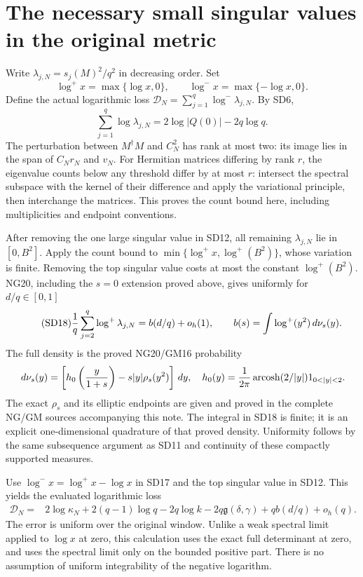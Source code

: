\section{The necessary small singular values in the original metric}
Write $\lambda_{j,N}=s_j(M)^2/q^2$ in decreasing order. Set
\[
\log^+x=\max\{\log x,0\},\qquad \log^-x=\max\{-\log x,0\}.
\]
Define the actual logarithmic loss
$\mathcal D_N=\sum_{j=1}^q\log^-\lambda_{j,N}$.
By SD6,
\begin{equation}\tag{SD17}
\sum_{j=1}^q\log\lambda_{j,N}=2\log|Q(0)|-2q\log q.
\end{equation}
The perturbation between $M^\dagger M$ and $C_N^2$ has rank at most
two: its image lies in the span of $C_Nr_N$ and $v_N$.
For Hermitian matrices differing by rank $r$, the eigenvalue counts
below any threshold differ by at most $r$: intersect the spectral
subspace with the kernel of their difference and apply the variational
principle, then interchange the matrices. This proves the count bound
here, including multiplicities and endpoint conventions.

After removing the one large singular value in SD12, all remaining
$\lambda_{j,N}$ lie in $[0,B^2]$. Apply the count bound to
$\min\{\log^+x,\log^+(B^2)\}$, whose variation is finite. Removing
the top singular value costs at most the constant $\log^+(B^2)$.
NG20, including the $s=0$
extension proved above, gives uniformly for $d/q\in[0,1]$
\begin{equation}\tag{SD18}
\frac1q\sum_{j=2}^q\log^+\lambda_{j,N}
=b(d/q)+o_h(1),\qquad
b(s)=\int\log^+(y^2)\,d\nu_s(y).
\end{equation}
The full density is the proved NG20/GM16 probability
\[
\osddd\nu_s(y)=\left[h_0\left(\frac y{1+s}\right)
-s|y|\rho_s(y^2)\right]\osddd y,\quad
h_0(y)=\frac1{2\pi}\operatorname{arcosh}(2/|y|)1_{0<|y|<2}.
\]
The exact $\rho_s$ and its elliptic endpoints are given and proved in
the complete NG/GM sources accompanying this note. The integral in
SD18 is finite; it is an explicit one-dimensional quadrature of that
proved density. Uniformity follows by the same subsequence argument
as SD11 and continuity of these compactly supported measures.

Use $\log^-x=\log^+x-\log x$ in SD17 and the top singular value in
SD12. This yields the evaluated logarithmic loss
\begin{equation}\tag{SD19}
\boxed{\begin{aligned}
\mathcal D_N={}&2\log\kappa_N+2(q-1)\log q-2q\log k
-2q\mathfrak g(\delta,\gamma)+qb(d/q)+o_h(q).
\end{aligned}}
\end{equation}
The error is uniform over the original window. Unlike a weak spectral
limit applied to $\log x$ at zero, this calculation uses the exact
full determinant at zero, and uses the spectral limit only on the
bounded positive part. There is no assumption of uniform integrability
of the negative logarithm.

